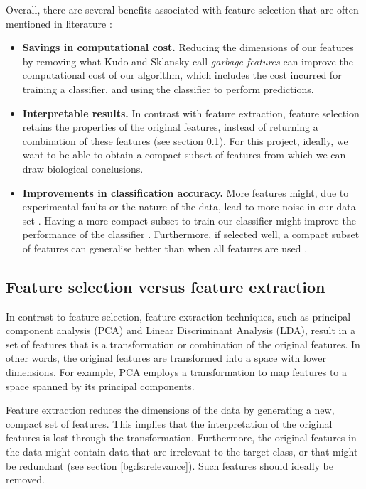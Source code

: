 \documentclass[12pt, twoside, a4paper]{report}
\begin{document}
Overall, there are several benefits associated with feature selection that are often mentioned in literature \cite{RefWorks:140}:
\begin{itemize}
  \item \textbf{Savings in computational cost.} Reducing the dimensions of our features by removing what Kudo and Sklansky call \textit{garbage features} \cite{RefWorks:210} can improve the computational cost of our algorithm, which includes the cost incurred for training a classifier, and using the classifier to perform predictions.
  \item \textbf{Interpretable results.} In contrast with feature extraction, feature selection retains the properties of the original features, instead of returning a combination of these features (see section \ref{bg:fs:extraction}). For this project, ideally, we want to be able to obtain a compact subset of features from which we can draw biological conclusions.
  \item \textbf{Improvements in classification accuracy.} More features might, due to experimental faults or the nature of the data, lead to more noise in our data set \cite{RefWorks:163, RefWorks:197}. Having a more compact subset to train our classifier might improve the performance of the classifier \cite{RefWorks:174}. Furthermore, if selected well, a compact subset of features can generalise better than when all features are used \cite{RefWorks:233}.
\end{itemize}

\subsection{Feature selection versus feature extraction} \label{bg:fs:extraction}

In contrast to feature selection, feature extraction techniques, such as principal component analysis (PCA) and Linear Discriminant Analysis (LDA), result in a set of features that is a transformation or combination of the original features. In other words, the original features are transformed into a space with lower dimensions. For example, PCA employs a transformation to map features to a space spanned by its principal components.

Feature extraction reduces the dimensions of the data by generating a new, compact set of features. This implies that the interpretation of the original features is lost through the transformation. Furthermore, the original features in the data might contain data that are irrelevant to the target class, or that might be redundant (see section \ref{bg:fs:relevance}). Such features should ideally be removed.
\end{document}
